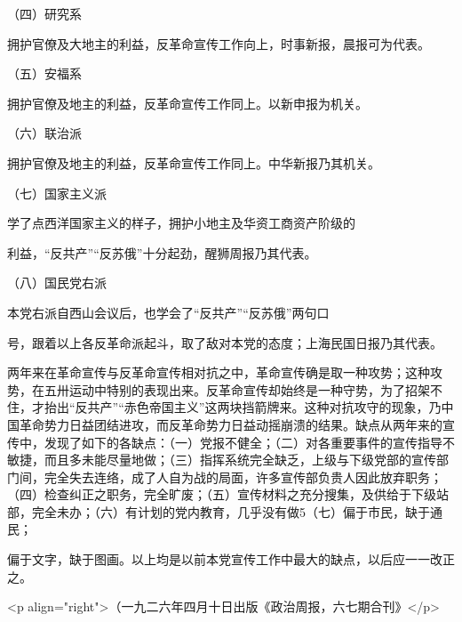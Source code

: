 （四）研究系

拥护官僚及大地主的利益，反革命宣传工作向上，时事新报，晨报可为代表。

（五）安福系

拥护官僚及地主的利益，反革命宣传工作同上。以新申报为机关。

（六）联治派

拥护官僚及地主的利益，反革命宣传工作同上。中华新报乃其机关。

（七）国家主义派

学了点西洋国家主义的样子，拥护小地主及华资工商资产阶级的

利益，“反共产”“反苏俄”十分起劲，醒狮周报乃其代表。

（八）国民党右派

本党右派自西山会议后，也学会了“反共产”“反苏俄”两句口

号，跟着以上各反革命派起斗，取了敌对本党的态度；上海民国日报乃其代表。

两年来在革命宣传与反革命宣传相对抗之中，革命宣传确是取一种攻势；这种攻势，在五卅运动中特别的表现出来。反革命宣传却始终是一种守势，为了招架不住，才抬出“反共产”“赤色帝国主义”这两块挡箭牌来。这种对抗攻守的现象，乃中国革命势力日益团结进攻，而反革命势力日益动摇崩溃的结果。缺点从两年来的宣传中，发现了如下的各缺点：（一）党报不健全；（二）对各重要事件的宣传指导不敏捷，而且多未能尽量地做；（三）指挥系统完全缺乏，上级与下级党部的宣传部门间，完全失去连络，成了人自为战的局面，许多宣传部负贵人因此放弃职务；（四）检查纠正之职务，完全旷废；（五）宣传材料之充分搜集，及供给于下级站部，完全未办；（六）有计划的党内教育，几乎没有做5（七）偏于市民，缺于通民；

偏于文字，缺于图画。以上均是以前本党宣传工作中最大的缺点，以后应一一改正之。

<p align="right">（一九二六年四月十日出版《政治周报，六七期合刊》</p>

